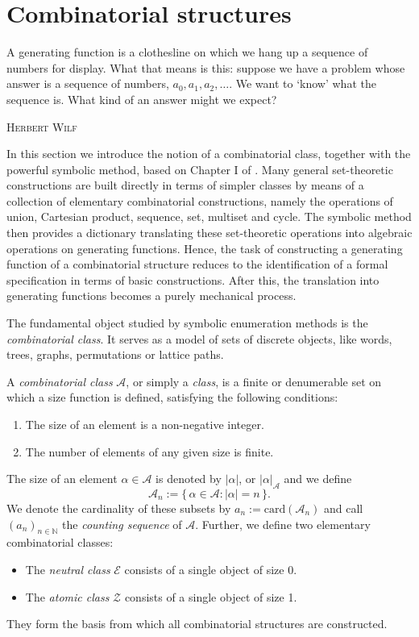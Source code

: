 \section{Combinatorial structures}

\epigraph{A generating function is a clothesline on which we hang up a sequence of numbers for display. What that means is this: suppose we have a problem whose answer is a sequence of numbers, $a_0,a_1,a_2,\dots$. We want to `know' what the sequence is. What kind of an answer might we expect?}{\textsc{Herbert Wilf} \cite[p.~1]{GeneratingFunctionology}}

In this section we introduce the notion of a combinatorial class, together with the powerful symbolic method, based on Chapter I of \cite{AnalyticCombinatorics}. Many general set-theoretic constructions are built directly in terms of simpler classes by means of a collection of elementary combinatorial constructions, namely the operations of union, Cartesian product, sequence, set, multiset and cycle. The symbolic method then provides a dictionary translating these set-theoretic operations into algebraic operations on generating functions. Hence, the task of constructing a generating function of a combinatorial structure reduces to the identification of a formal specification in terms of basic constructions. After this, the translation into generating functions becomes a purely mechanical process.

The fundamental object studied by symbolic enumeration methods is the \textit{combinatorial class}. It serves as a model of sets of discrete objects, like words, trees, graphs, permutations or lattice paths.

\begin{definition}
  A \textit{combinatorial class} $\mathcal{A}$, or simply a \textit{class}, is a finite or denumerable set on which a size function is defined, satisfying the following conditions:
  \begin{enumerate}
    \item The size of an element is a non-negative integer.
    \item The number of elements of any given size is finite.
  \end{enumerate}
  The size of an element $\alpha \in \mathcal{A}$ is denoted by $|\alpha|$, or $|\alpha|_{\mathcal{A}}$ and we define 
  $$
    \mathcal{A}_n := \{\, \alpha \in \mathcal{A} : |\alpha| = n \,\}.
  $$
  We denote the cardinality of these subsets by $a_n := \mathrm{card}(\mathcal{A}_n)$ and call $(a_n)_{n\in\mathbb{N}}$ the \textit{counting sequence} of $\mathcal{A}$.
  Further, we define two elementary combinatorial classes:
  \begin{itemize}
    \item The \textit{neutral class} $\mathcal{E}$ consists of a single object of size 0.
    \item The \textit{atomic class} $\mathcal{Z}$ consists of a single object of size 1.
  \end{itemize}
  They form the basis from which all combinatorial structures are constructed.
\end{definition}

